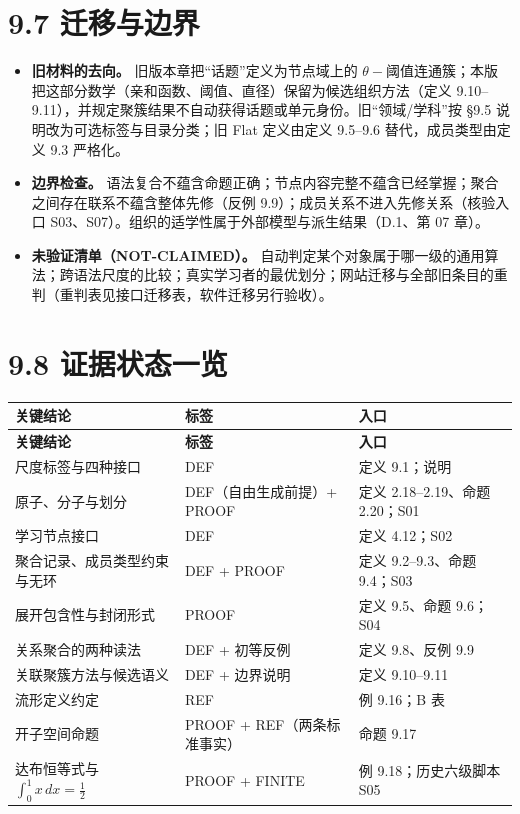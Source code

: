 \documentclass[UTF8,a4paper,zihao=-4,fontset=windows,openany]{ctexbook}
\begin{document}
\section{9.7 迁移与边界}
\begin{itemize}
\item \textbf{旧材料的去向。} 旧版本章把“话题”定义为节点域上的 \(\theta-\)阈值连通簇；本版把这部分数学（亲和函数、阈值、直径）保留为候选组织方法（定义 9.10–9.11），并规定聚簇结果不自动获得话题或单元身份。旧“领域/学科”按 §9.5 说明改为可选标签与目录分类；旧 Flat 定义由定义 9.5–9.6 替代，成员类型由定义 9.3 严格化。
\item \textbf{边界检查。} 语法复合不蕴含命题正确；节点内容完整不蕴含已经掌握；聚合之间存在联系不蕴含整体先修（反例 9.9）；成员关系不进入先修关系（核验入口 S03、S07）。组织的适学性属于外部模型与派生结果（D.1、第 07 章）。
\item \textbf{未验证清单（NOT-CLAIMED）。} 自动判定某个对象属于哪一级的通用算法；跨语法尺度的比较；真实学习者的最优划分；网站迁移与全部旧条目的重判（重判表见接口迁移表，软件迁移另行验收）。
\end{itemize}
\section{9.8 证据状态一览}
\begingroup\small\setlength{\tabcolsep}{4pt}
\begin{longtable}{>{\raggedright\arraybackslash}p{}>{\raggedright\arraybackslash}p{}>{\raggedright\arraybackslash}p{}}
\toprule
\textbf{关键结论} & \textbf{标签} & \textbf{入口} \\
\midrule
\endfirsthead
\toprule
\textbf{关键结论} & \textbf{标签} & \textbf{入口} \\
\midrule
\endhead
\bottomrule
\endfoot
\bottomrule
\endlastfoot
尺度标签与四种接口 & DEF & 定义 9.1；说明 \\
原子、分子与划分 & DEF（自由生成前提）+ PROOF & 定义 2.18–2.19、命题 2.20；S01 \\
学习节点接口 & DEF & 定义 4.12；S02 \\
聚合记录、成员类型约束与无环 & DEF + PROOF & 定义 9.2–9.3、命题 9.4；S03 \\
展开包含性与封闭形式 & PROOF & 定义 9.5、命题 9.6；S04 \\
关系聚合的两种读法 & DEF + 初等反例 & 定义 9.8、反例 9.9 \\
关联聚簇方法与候选语义 & DEF + 边界说明 & 定义 9.10–9.11 \\
流形定义约定 & REF & 例 9.16；B 表 \\
开子空间命题 & PROOF + REF（两条标准事实） & 命题 9.17 \\
达布恒等式与 \(\int_0^1 x\,dx=\tfrac12\) & PROOF + FINITE & 例 9.18；历史六级脚本 S05 \\
\end{longtable}
\endgroup
\end{document}
